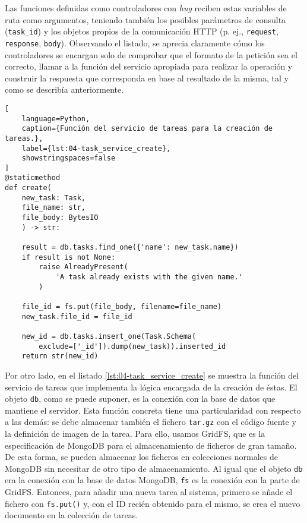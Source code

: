 Las funciones definidas como controladores con \textit{hug} reciben
estas variables de ruta como argumentos, teniendo también los posibles
parámetros de consulta (\texttt{task\_id}) y los objetos propios de la
comunicación HTTP (p. ej., \texttt{request}, \texttt{response}, \texttt{body}).
Observando el listado, se aprecia claramente cómo los controladores se encargan
solo de comprobar que el formato de la petición sea el correcto, llamar a la
función del servicio apropiada para realizar la operación y construir la
respuesta que corresponda en base al resultado de la misma, tal y como se
describía anteriormente.

\begin{lstlisting}[
    language=Python,
    caption={Función del servicio de tareas para la creación de tareas.},
    label={lst:04-task_service_create},
    showstringspaces=false
]
@staticmethod
def create(
    new_task: Task,
    file_name: str,
    file_body: BytesIO
    ) -> str:

    result = db.tasks.find_one({'name': new_task.name})
    if result is not None:
        raise AlreadyPresent(
            'A task already exists with the given name.'
        )

    file_id = fs.put(file_body, filename=file_name)
    new_task.file_id = file_id

    new_id = db.tasks.insert_one(Task.Schema(
        exclude=['_id']).dump(new_task)).inserted_id
    return str(new_id)
\end{lstlisting}

Por otro lado, en el listado \ref{lst:04-task_service_create} se muestra la
función del servicio de tareas que implementa la lógica encargada de la creación
de éstas. El objeto \texttt{db}, como se puede suponer, es la conexión con la
base de datos que mantiene el servidor. Esta función concreta tiene una
particularidad con respecto a las demás: se debe almacenar también el fichero
\texttt{tar.gz} con el código fuente y la definición de imagen de la tarea. Para
ello, usamos GridFS, que es la especificación de MongoDB para el almacenamiento
de ficheros de gran tamaño. De esta forma, se pueden almacenar los ficheros en
colecciones normales de MongoDB sin necesitar de otro tipo de almacenamiento. Al
igual que el objeto \texttt{db} era la conexión con la base de datos MongoDB,
\texttt{fs} es la conexión con la parte de GridFS. Entonces, para añadir una
nueva tarea al sistema, primero se añade el fichero con \texttt{fs.put()} y, con
el ID recién obtenido para el mismo, se crea el nuevo documento en la colección
de tareas.

